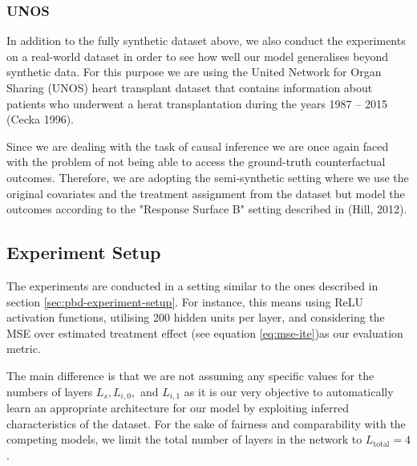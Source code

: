 
\subsubsection{UNOS}
In addition to the fully synthetic dataset above, we also conduct the experiments on a real-world dataset in order to see how well our model generalises beyond synthetic data. For this purpose we are using the United Network for Organ Sharing (UNOS) heart transplant dataset  
that contains information about patients who underwent a herat transplantation during the years 1987 -- 2015 (Cecka 1996).%

Since we are dealing with the task of causal inference we are once again faced with the problem of not being able to access the ground-truth counterfactual outcomes. Therefore, we are adopting the semi-synthetic setting where we use the original covariates and the treatment assignment from the dataset but model the outcomes according to the "Response Surface B" setting described in (Hill, 2012). %



\subsection{Experiment Setup}
The experiments are conducted in a setting similar to the ones described in section \ref{sec:pbd-experiment-setup}. For instance, this means using ReLU activation functions, utilising 200 hidden units per layer, and considering the MSE over estimated treatment effect (see equation \ref{eq:mse-ite})as our evaluation metric. 

The main difference is that we are not assuming any specific values for the numbers of layers $L_s, L_{i,0},$ and $L_{i,1}$ as it is our very objective to automatically learn an appropriate architecture for our model by exploiting inferred characteristics of the dataset. For the sake of fairness and  comparability with the competing models, we limit the total number of layers in the network to $L_{\text{total}} = 4$. 

